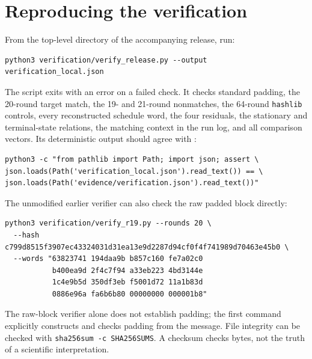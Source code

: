 \documentclass[11pt,a4paper]{article}
\newcommand{\hex}[1]{\texttt{#1}}
\begin{document}
\section{Reproducing the verification}
From the top-level directory of the accompanying release, run:
\begin{Verbatim}[fontsize=\small]
python3 verification/verify_release.py --output verification_local.json
\end{Verbatim}
The script exits with an error on a failed check. It checks standard padding, the 20-round target match, the 19- and 21-round nonmatches, the 64-round \hex{hashlib} controls, every reconstructed schedule word, the four residuals, the stationary and terminal-state relations, the matching context in the run log, and all comparison vectors. Its deterministic output should agree with :
\begin{Verbatim}[fontsize=\small]
python3 -c "from pathlib import Path; import json; assert \
json.loads(Path('verification_local.json').read_text()) == \
json.loads(Path('evidence/verification.json').read_text())"
\end{Verbatim}
The unmodified earlier verifier can also check the raw padded block directly:
\begin{Verbatim}[fontsize=\scriptsize]
python3 verification/verify_r19.py --rounds 20 \
  --hash c799d8515f3907ec43324031d31ea13e9d2287d94cf0f4f741989d70463e45b0 \
  --words "63823741 194daa9b b857c160 fe7a02c0
           b400ea9d 2f4c7f94 a33eb223 4bd3144e
           1c4e9b5d 350df3eb f5001d72 11a1b83d
           0886e96a fa6b6b80 00000000 000001b8"
\end{Verbatim}
The raw-block verifier alone does not establish padding; the first command explicitly constructs and checks padding from the message. File integrity can be checked with \hex{sha256sum -c SHA256SUMS}. A checksum checks bytes, not the truth of a scientific interpretation.
\end{document}
